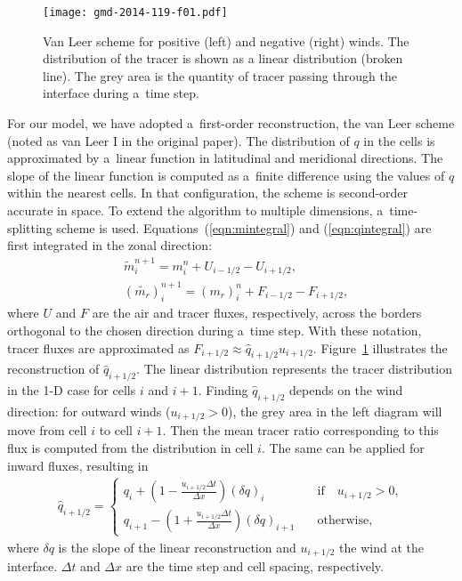 \begin{figure}[t]
  \begin{centering}
\texttt{[image: gmd-2014-119-f01.pdf]}
\caption{Van Leer scheme for positive (left) and negative (right) winds. The distribution of the
tracer is shown as a linear distribution (broken line). The grey area is the
quantity of tracer passing through the interface during a~time step.}
\label{fig2:van_leer}%
  \end{centering}
\end{figure}%




   For our model, we have adopted a~first-order reconstruction, the
   van Leer scheme (noted as van Leer I in the original paper). The
   distribution of $q$ in the cells is approximated by a~linear
   function in latitudinal and meridional directions. The slope of the
   linear function is computed as a~finite difference using the values
   of $q$ within the nearest cells. In that configuration, the scheme
   is second-order accurate in space. To extend the algorithm to multiple
   dimensions, a~time-splitting scheme is
   used. Equations~(\ref{eqn:mintegral}) and (\ref{eqn:qintegral}) are
   first integrated in the zonal direction:
   \begin{align}
     &   \widetilde{m}_i^{n+1} = m_i^{n} + U_{i-1/2} - U_{i+1/2},\nonumber \\
     &   (\widetilde{m_r})_i^{n+1} = (m_r)_i^{n} + F_{i-1/2} - F_{i+1/2},
     \label{eqn:flux}
   \end{align}
   where $U$ and $F$ are the air and tracer fluxes, respectively, across
   the borders orthogonal to the chosen direction during
   a~time step. With these notation, tracer fluxes are approximated
   as $F_{i+1/2} \approx \widehat{q}_{i+1/2} u_{i+1/2}$.
   Figure~\ref{fig2:van_leer} illustrates the reconstruction of
   $\widehat{q}_{i+1/2}$.  The linear distribution represents the tracer
   distribution in the 1-D case for cells $i$ and $i+1$. Finding
   $\widehat{q}_{i+1/2}$ depends on the wind direction: for outward winds
   ($u_{i+1/2} > 0$), the grey area in the left diagram will move from
   cell $i$ to cell $i+1$. Then the mean tracer ratio corresponding to
   this flux is computed from the distribution in cell $i$.  The same
   can be applied for inward fluxes, resulting in
   \begin{align*}
     \widehat{q}_{i+1/2} =
     \begin{cases}
       q_i + \left(1 -  \frac{u_{i+1/2} \Delta t}{\Delta x}\right)(\delta q)_i
       \quad &\text{if} \quad u_{i+1/2} > 0,\\
       q_{i+1} - \left(1 + \frac{u_{i+1/2} \Delta t}{\Delta x}\right) (\delta q)_{i+1}
       \quad &\text{otherwise},
     \end{cases}
   \end{align*}
   where $\delta q$ is the slope of the linear reconstruction and
   $u_{i+1/2}$ the wind at the interface. $\Delta t$ and $\Delta x$
   are the time step and cell spacing, respectively.

